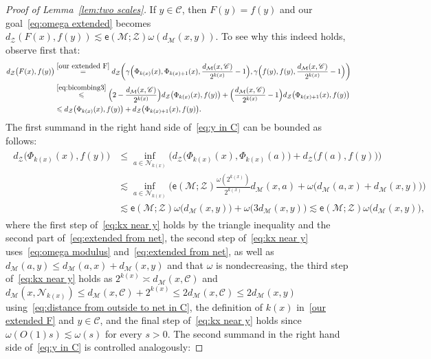 \documentclass[11pt,reqno]{amsart}
\renewcommand{\le}{\leqslant}
\newcommand{\ee}{\mathsf{e}}
\newcommand{\cZ}{\mathcal{Z}}
\newcommand{\NN}{\mathcal{N}}
\newcommand{\MM}{\mathcal{M}}
\newcommand{\sub}{\mathscr{C}}
\begin{document}
\begin{proof}[Proof of Lemma~\ref{lem:two scales}]
If $y\in \sub$, then $F(y)=f(y)$ and our goal~\eqref{eq:omega extended} becomes $d_\cZ(F(x),f(y))\lesssim \ee(\MM;\cZ)\omega(d_\MM(x,y))$. To see why this indeed holds, observe first that:
\begin{align}\label{eq:y in C}
\begin{split}
d_\cZ\big(F(x),f(y)\big)&\stackrel{\eqref{our extended F}}{=}d_\cZ\bigg(\gamma\Big(\Phi_{k(x)}(x),\Phi_{k(x) +1}(x),\frac{d_\MM(x,\sub)}{2^{k(x)}}-1\Big),\gamma\Big(f(y),f(y),\frac{d_\MM(x,\sub)}{2^{k(x)}}-1\Big)\bigg)\\&\stackrel{\eqref{eq:bicombing3}}{\le} \Big(2-\frac{d_\MM(x,\sub)}{2^{k(x)}}\Big)
d_\cZ\big(\Phi_{k(x)}(x),f(y)\big)+\Big(\frac{d_\MM(x,\sub)}{2^{k(x)}}-1\Big)d_\cZ\big(\Phi_{k(x)+1}(x),f(y)\big)\\
&\le 
d_\cZ\big(\Phi_{k(x)}(x),f(y)\big)+d_\cZ\big(\Phi_{k(x)+1}(x),f(y)\big).
\end{split}
\end{align}
The first summand in the right hand side of~\eqref{eq:y in C} can be bounded as follows:
\begin{align}
\begin{split}\label{eq:kx near y}
d_\cZ\big(\Phi_{k(x)}(x),f(y)\big)&\le \inf_{a\in \NN_{k(x)}} \Big(d_\cZ\big(\Phi_{k(x)}(x),\Phi_{k(x)}(a)\big)+d_\cZ\big(f(a),f(y)\big)\Big)\\& \lesssim
\inf_{a\in \NN_{k(x)}} \Big(\ee(\MM;\cZ)\frac{\omega(2^{k(x)})}{2^{k(x)}}d_\MM(x,a)+\omega\big(d_\MM(a,x)+d_\MM(x,y)\big)\Big)\\& \lesssim \ee(\MM;\cZ)\omega\big(d_\MM(x,y)\big)+\omega\big(3d_\MM(x,y)\big)\lesssim \ee(\MM;\cZ)\omega\big(d_\MM(x,y)\big),
\end{split}
\end{align}
where the first step of~\eqref{eq:kx near y} holds by the triangle inequality and the second part of~\eqref{eq:extended from net},  the second step of~\eqref{eq:kx near y} uses~\eqref{eq:omega modulus} and~\eqref{eq:extended from net}, as well as $d_\MM(a,y)\le d_\MM(a,x)+d_\MM(x,y)$ and  that $\omega$ is nondecreasing, the third step of~\eqref{eq:kx near y}  holds as $2^{k(x)}\asymp d_\MM(x,\sub)$ and  $d_\MM(x,\NN_{k(x)})\le d_\MM(x,\sub) +2^{k(x)}\le 2d_\MM(x,\sub)\le 2d_\MM(x,y)$ using~\eqref{eq:distance from outside to net in C}, the definition of $k(x)$ in~\eqref{our extended F} and $y\in \sub$, and the final step of~\eqref{eq:kx near y} holds since $\omega(O(1)s)\lesssim \omega(s)$ for every $s>0$.     The second summand in the right hand side of~\eqref{eq:y in C} is controlled analogously: 

\end{proof}
\end{document}
